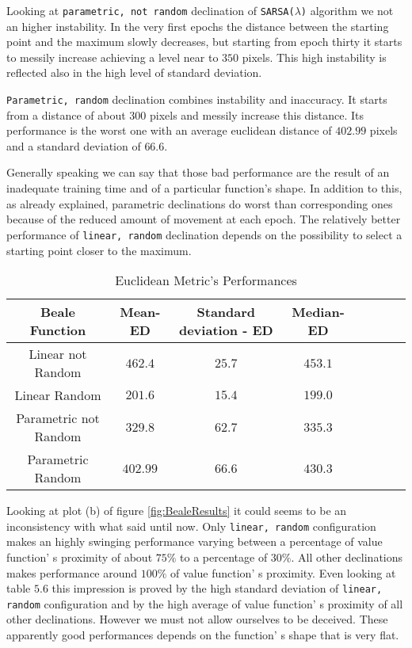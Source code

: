 Looking at {\tt parametric, not random} declination of  {\tt SARSA($\lambda$)} algorithm we not an higher instability. In the very first epochs the distance between the starting point and the maximum slowly decreases, but starting from epoch thirty it starts to messily increase achieving a level near to $350$ pixels. This high instability is reflected also in the high level of standard deviation.

{\tt Parametric, random} declination combines instability and inaccuracy. It starts from a distance of about $300$ pixels and messily increase this distance. Its performance is the worst one with an average euclidean distance of $402.99$ pixels and a standard deviation of $66.6$.

Generally speaking we can say that those bad performance are the result of an inadequate training time and of a particular function's shape. In addition to this, as already explained, parametric declinations do worst than corresponding ones because of the reduced amount of movement at each epoch. The relatively better performance of {\tt linear, random} declination depends on the possibility to select a starting point closer to the maximum. \\

\begin{table}[h!]
\centering
\resizebox{\linewidth}{!} {
	\begin{tabular}{c| ccccccc} 
		\hline \textbf{Beale Function}
		& \textbf{Mean-ED} & \textbf{Standard deviation - ED}  &\textbf{Median-ED} \\ 
		\hline Linear not Random
		& $462.4$ & $25.7$ & $453.1$  \\ 
		\hline Linear Random
		& \cellcolor{red!25}$201.6$ & \cellcolor{red!25}$15.4$ & \cellcolor{red!25}$199.0$ \\ 
		\hline Parametric not Random
		& $329.8$ & $62.7$ & $335.3$ \\ 
		\hline Parametric Random
		& $402.99$ & $66.6$ & $430.3$ \\ 
		\hline 
	\end{tabular} 
}
\label{BealeTabEuclidean}
\caption{Euclidean Metric's Performances}
\end{table}

Looking at plot (b) of figure \ref{fig:BealeResults} it could seems to be an inconsistency with what said until now. Only {\tt linear, random} configuration makes an highly swinging performance varying between a percentage of value function' s proximity of about $75\%$ to a percentage of $30\%$. All other declinations makes performance around $100\%$ of value function' s proximity. Even looking at table $5.6$ this impression is proved by the high standard deviation of {\tt linear, random} configuration and by the high average of value function' s proximity of all other declinations. However we must not allow ourselves to be deceived. These apparently good performances depends on the function' s shape that is very flat. 

